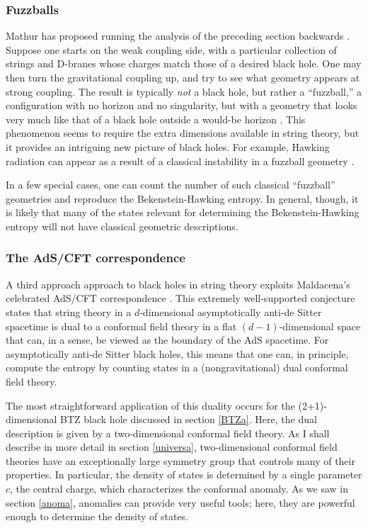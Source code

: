 \documentclass[12pt]{article}
\begin{document}
\subsubsection{Fuzzballs \label{fuzza}}

Mathur has proposed running the analysis of the 
preceding section backwards \cite{Mathur}.  Suppose one starts on
the weak coupling side, with a particular collection of strings and
D-branes whose charges match those of a desired black hole.  One
may then turn the gravitational coupling up, and try to see what 
geometry appears at strong coupling.  The result is typically 
\emph{not} a black hole, but rather a ``fuzzball,'' a configuration 
with no horizon and no singularity, but with a geometry that looks 
very much like that of a  black hole outside a would-be horizon 
\cite{Mathurb,Mathurc}.  This phenomenon seems to require 
the extra dimensions available in string theory, but it provides
an intriguing new picture of black holes.  For example, Hawking 
radiation can appear as a result of a classical instability in a
fuzzball geometry \cite{Chowdhury}.

 In a few special cases, one can count the number of such 
classical ``fuzzball'' geometries and reproduce the 
Bekenstein-Hawking entropy.  In general, though, it is
likely that many of the states relevant for determining the
Bekenstein-Hawking entropy will not have classical geometric
descriptions.

\subsubsection{The AdS/CFT correspondence \label{adscfta}}

A third approach approach to black 
holes in string theory exploits Maldacena's celebrated AdS/CFT 
correspondence \cite{Malda,AGMOO}.  This extremely well-supported 
conjecture states that string theory in a $d$-dimensional 
asymptotically anti-de Sitter spacetime is dual to a conformal field 
theory in a flat $(d-1)$-dimensional space that can, in a sense, 
be viewed as the boundary of the AdS spacetime.  For asymptotically 
anti-de Sitter black holes, this means that one can, in principle,
compute the entropy by counting states in a (nongravitational) dual 
conformal field theory.  

The most straightforward application of this duality occurs for the
(2+1)-dimensional BTZ black hole discussed in section \ref{BTZa}.
Here, the dual description is given by a two-dimensional  conformal 
field theory.  As I shall describe in more detail in section \ref{universa},
two-dimensional conformal field theories have an exceptionally
large symmetry group that controls many of their properties.  In
particular, the density of states is determined by a single parameter
$c$, the central charge, which characterizes the conformal anomaly.
As we saw in section \ref{anoma}, anomalies can provide very useful
tools; here, they are powerful enough to determine the density of
states.
 
\end{document}
